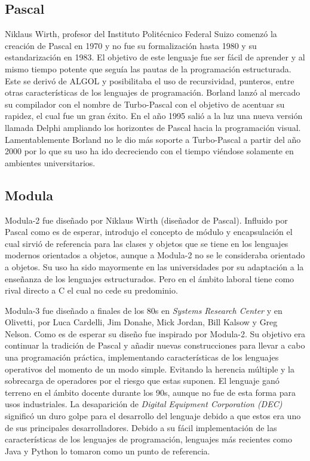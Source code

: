 \documentclass[twoside,twocolumn]{article}
\begin{document}
\subsection{Pascal}

Niklaus Wirth, profesor del Instituto Politécnico Federal Suizo comenzó la creación de Pascal en 1970 y no fue su formalización hasta 1980 y su estandarización en 1983. El objetivo de este lenguaje fue ser fácil de aprender y al mismo tiempo potente que seguía las pautas de la programación estructurada. Este se derivó de ALGOL y posibilitaba el uso de recursividad, punteros, entre otras características de los lenguajes de programación. Borland lanzó al mercado su compilador con el nombre de Turbo-Pascal con el objetivo de acentuar su rapidez, el cual fue un gran éxito. En el año 1995 salió a la luz una nueva versión llamada Delphi ampliando los horizontes de Pascal hacia la programación visual. Lamentablemente Borland no le dio más soporte a Turbo-Pascal a partir del año 2000 por lo que su uso ha ido decreciendo con el tiempo viéndose solamente en ambientes universitarios.


\subsection{Modula}
Modula-2 fue diseñado por Niklaus Wirth (diseñador de Pascal). Influido por Pascal como es de esperar, introdujo el concepto de módulo y encapsulación el cual sirvió de referencia para las clases y objetos que se tiene en los lenguajes modernos orientados a objetos, aunque a Modula-2 no se le consideraba orientado a objetos. Su uso ha sido mayormente en las universidades por su adaptación a la enseñanza de los lenguajes estructurados. Pero en el ámbito laboral tiene como rival directo a C el cual no cede su predominio.

Modula-3 fue diseñado a finales de los 80s en \textit{Systems Research Center} y en Olivetti, por Luca Cardelli, Jim Donahe, Mick Jordan, Bill Kalsow y Greg Nelson. Como es de esperar su diseño fue inspirado por Modula-2. Su objetivo era continuar la tradición de Pascal y añadir nuevas construcciones para llevar a cabo una programación práctica, implementando características de los lenguajes operativos del momento de un modo simple. Evitando la herencia múltiple y la sobrecarga de operadores por el riesgo que estas suponen. El lenguaje ganó terreno en el ámbito docente durante los 90s, aunque no fue de esta forma para usos industriales. La desaparición de \textit{Digital Equipment Corporation (DEC)} significó un duro golpe para el desarrollo del lenguaje debido a que estos era uno de sus principales desarrolladores. Debido a su fácil implementación de las características de los lenguajes de programación, lenguajes más recientes como Java y Python lo tomaron como un punto de referencia.
\end{document}
